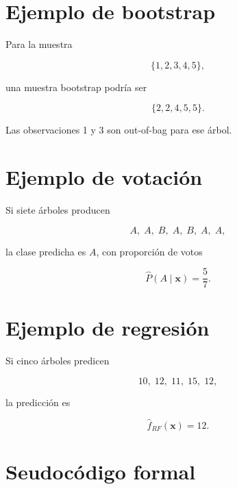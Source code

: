 \documentclass[
  spanish,
  10.5pt,
  letterpaper,
  DIV=11,
  numbers=noendperiod,
  oneside,
  open=any]{scrreprt}
\theoremstyle{definition}
\theoremstyle{definition}
\theoremstyle{plain}
\theoremstyle{remark}
\begin{document}
\section*{Ejemplo de bootstrap}\label{ejemplo-de-bootstrap}


Para la muestra

\[
\{1,2,3,4,5\},
\]

una muestra bootstrap podría ser

\[
\{2,2,4,5,5\}.
\]

Las observaciones 1 y 3 son out-of-bag para ese árbol.

\section*{Ejemplo de votación}\label{ejemplo-de-votaciuxf3n}


Si siete árboles producen

\[
A,\;A,\;B,\;A,\;B,\;A,\;A,
\]

la clase predicha es \(A\), con proporción de votos

\[
\widehat{P}(A\mid\mathbf{x})=\frac{5}{7}.
\]

\section*{Ejemplo de regresión}\label{ejemplo-de-regresiuxf3n}


Si cinco árboles predicen

\[
10,\;12,\;11,\;15,\;12,
\]

la predicción es

\[
\widehat{f}_{RF}(\mathbf{x})=12.
\]

\section*{Seudocódigo formal}\label{seudocuxf3digo-formal-5}

\end{document}
